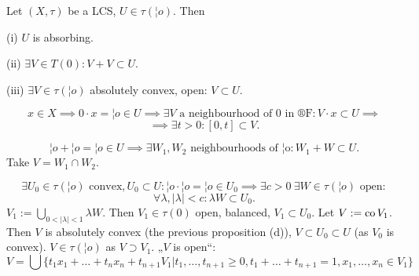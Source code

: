 \documentclass[12pt]{article}					%
\begin{document}
\begin{tvrzeni}
	Let $(X, τ)$ be a LCS, $U \in τ(¦o)$. Then
	
	(i) $U$ is absorbing.

	(ii) $\exists V \in T(0): V + V \subset U$.

	(iii) $\exists V \in τ(¦o)$ absolutely convex, open: $V \subset U$.

	\begin{dukazin}[i]
		$$ x \in X \implies 0·x = ¦o \in U \implies \exists V \text{ a neighbourhood of $0$ in ®F}: V·x \subset U \implies $$
		$$ \implies \exists t > 0: [0, t] \subset V. $$
	\end{dukazin}

	\begin{dukazin}[ii]
		$$ ¦o + ¦o = ¦o \in U \implies \exists W_1, W_2 \text{ neighbourhoods of ¦o}: W_1 + W \subset U. $$
		Take $V = W_1 \cap W_2$.
	\end{dukazin}

	\begin{dukazin}
		$$ \exists U_0 \in τ(¦o) \text{ convex}, U_0 \subset U: ¦o·¦o = ¦o \in U_0 \implies \exists c > 0\ \exists W \in τ(¦o) \text{ open}: $$
		$$ \forall λ, |λ| < c: λW \subset U_0. $$
		$V_1 := \bigcup_{0 < |λ| < 1} λW$. Then $V_1 \in τ(0)$ open, balanced, $V_1 \subset U_0$. Let $V := \operatorname{co} V_1$. Then $V$ is absolutely convex (the previous proposition (d)), $V \subset U_0 \subset U$ (as $V_0$ is convex). $V \in τ(¦o)$ as $V \supset V_1$. „$V$ is open“:
		$$ V = \bigcup\{t_1x_1 + … + t_nx_n + t_{n+1}V_1 | t_1, …, t_{n+1} ≥ 0, t_1 + … + t_{n+1} = 1, x_1, …, x_n \in V_1\} $$
	\end{dukazin}
\end{tvrzeni}

\end{document}

